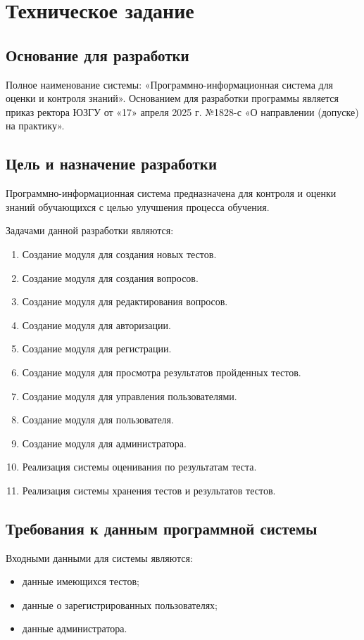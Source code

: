 \section{Техническое задание}
\subsection{Основание для разработки}

Полное наименование системы: «Программно-информационная система для оценки и контроля знаний».
Основанием для разработки программы является приказ ректора ЮЗГУ
от «17» апреля 2025 г. №1828-с «О направлении (допуске) на практику».

\subsection{Цель и назначение разработки}

Программно-информационная система предназначена для контроля и оценки знаний обучающихся с целью улучшения процесса обучения.

Задачами данной разработки являются:
\begin{enumerate}
\item Создание модуля для создания новых тестов.
\item Создание модуля для создания вопросов.
\item Создание модуля для редактирования вопросов.
\item Создание модуля для авторизации.
\item Создание модуля для регистрации.
\item Создание модуля для просмотра результатов пройденных тестов.
\item Создание модуля для управления пользователями.
\item Создание модуля для пользователя.
\item Создание модуля для администратора.
\item Реализация системы оценивания по результатам теста.
\item Реализация системы хранения тестов и результатов тестов.
\end{enumerate}

\subsection{Требования к данным программной системы}

Входными данными для системы являются:
\begin{itemize}
    \item данные имеющихся тестов;
    \item данные о зарегистрированных пользователях;
    \item данные администратора.
\end{itemize}

